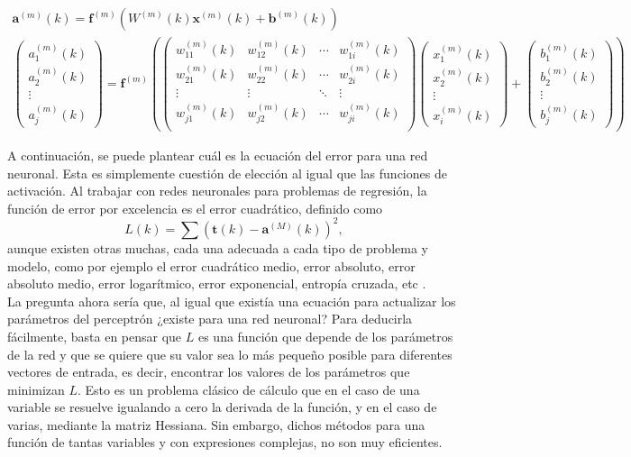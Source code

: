 		\begin{equation}
			\label{eq:prop}
			\begin{gathered}
				\textbf{a}^{(m)}(k) = \textbf{f}^{(m)}\left(W^{(m)}(k)\textbf{x}^{(m)}(k) + \textbf{b}^{(m)}(k)\right)\\
				\begin{pmatrix}
					a_1^{(m)}(k)\\a_2^{(m)}(k)\\\vdots\\a_j^{(m)}(k)
				\end{pmatrix} = \textbf{f}^{(m)}\left(
				\begin{pmatrix}
					w_{11}^{(m)}(k) & w_{12}^{(m)}(k) & \cdots & w_{1i}^{(m)}(k)\\
					w_{21}^{(m)}(k) & w_{22}^{(m)}(k) & \cdots & w_{2i}^{(m)}(k)\\
					\vdots & \vdots & \ddots & \vdots\\
					w_{j1}^{(m)}(k) & w_{j2}^{(m)}(k) & \cdots & w_{ji}^{(m)}(k)\\
				\end{pmatrix}
				\begin{pmatrix}
					x_1^{(m)}(k)\\x_2^{(m)}(k)\\\vdots\\x_i^{(m)}(k)
				\end{pmatrix} + 
				\begin{pmatrix}
					b_1^{(m)}(k)\\b_2^{(m)}(k)\\\vdots\\b_j^{(m)}(k)
				\end{pmatrix}\right)
			\end{gathered}
		\end{equation}
		
		A continuación, se puede plantear cuál es la ecuación del error para una red neuronal. Esta es simplemente cuestión de elección al igual que las funciones de activación. Al trabajar con redes neuronales para problemas de regresión, la función de error por excelencia es el error cuadrático, definido como
		$$
		L(k) = \sum(\textbf{t}(k) - \textbf{a}^{(M)}(k))^2, 
		$$
		aunque existen otras muchas, cada una adecuada a cada tipo de problema y modelo, como por ejemplo el error cuadrático medio, error absoluto, error absoluto medio, error logarítmico, error exponencial, entropía cruzada, etc \cite{funcionesError}.\\
		
		La pregunta ahora sería que, al igual que existía una ecuación para actualizar los parámetros del perceptrón ¿existe para una red neuronal? Para deducirla fácilmente, basta en pensar que $L$ es una función que depende de los parámetros de la red y que se quiere que su valor sea lo más pequeño posible para diferentes vectores de entrada, es decir, encontrar los valores de los parámetros que minimizan $L$. Esto es un problema clásico de cálculo que en el caso de una variable se resuelve igualando a cero la derivada de la función, y en el caso de varias, mediante la matriz Hessiana. Sin embargo, dichos métodos para una función de tantas variables y con expresiones complejas, no son muy eficientes. \\
		
